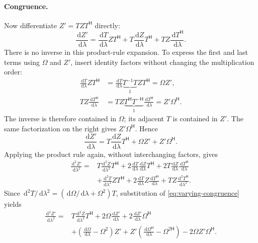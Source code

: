 \documentclass[11pt]{article}
\newcommand{\pv}[1]{{#1}}
\newcommand{\pvGreek}[1]{{#1}}
\newcommand{\pT}{\pv{T}}
\newcommand{\pZ}{\pv{Z}}
\newcommand{\pvOmega}{\pvGreek{\Omega}}
\numberwithin{equation}{section}
\newcommand{\dd}{\,\mathrm d}
\begin{document}
\paragraph{Congruence.}
Now differentiate $\pZ'=\pT\pZ\pT^{\mathsf H}$ directly:
\[
 \frac{\dd\pZ'}{\dd\lambda}
 =\frac{\dd\pT}{\dd\lambda}\pZ\pT^{\mathsf H}
   +\pT\frac{\dd\pZ}{\dd\lambda}\pT^{\mathsf H}
   +\pT\pZ\frac{\dd\pT^{\mathsf H}}{\dd\lambda}.
\]
There is no inverse in this product-rule expansion. To express the
first and last terms using $\pvOmega$ and $\pZ'$, insert identity
factors without changing the multiplication order:
\begin{align*}
 \frac{\dd\pT}{\dd\lambda}\pZ\pT^{\mathsf H}
 &=\frac{\dd\pT}{\dd\lambda}\underbrace{\pT^{-1}\pT}_{1}
   \pZ\pT^{\mathsf H}
 =\pvOmega\pZ',\\
 \pT\pZ\frac{\dd\pT^{\mathsf H}}{\dd\lambda}
 &=\pT\pZ\underbrace{\pT^{\mathsf H}\pT^{-\mathsf H}}_{1}
   \frac{\dd\pT^{\mathsf H}}{\dd\lambda}
 =\pZ'\pvOmega^{\mathsf H}.
\end{align*}
The inverse is therefore contained in $\pvOmega$; its adjacent $\pT$
is contained in $\pZ'$. The same factorization on the right gives
$\pZ'\pvOmega^{\mathsf H}$. Hence
\begin{equation}
 \frac{\dd\pZ'}{\dd\lambda}
 =\pT\frac{\dd\pZ}{\dd\lambda}\pT^{\mathsf H}
  +\pvOmega\pZ'+\pZ'\pvOmega^{\mathsf H}.
 \label{eq:varying-congruence}
\end{equation}
Applying the product rule again, without interchanging factors, gives
\begin{align*}
 \frac{\dd^2\pZ'}{\dd\lambda^2}={}&
 \pT\frac{\dd^2\pZ}{\dd\lambda^2}\pT^{\mathsf H}
 +2\frac{\dd\pT}{\dd\lambda}\frac{\dd\pZ}{\dd\lambda}\pT^{\mathsf H}
 +2\pT\frac{\dd\pZ}{\dd\lambda}\frac{\dd\pT^{\mathsf H}}{\dd\lambda}\\
 &+\frac{\dd^2\pT}{\dd\lambda^2}\pZ\pT^{\mathsf H}
 +2\frac{\dd\pT}{\dd\lambda}\pZ\frac{\dd\pT^{\mathsf H}}{\dd\lambda}
 +\pT\pZ\frac{\dd^2\pT^{\mathsf H}}{\dd\lambda^2}.
\end{align*}
Since $\dd^2\pT/\dd\lambda^2=(\dd\pvOmega/\dd\lambda+\pvOmega^2)\pT$,
substitution of \eqref{eq:varying-congruence} yields
\begin{equation}
 \boxed{\begin{aligned}
 \frac{\dd^2\pZ'}{\dd\lambda^2}={}&
 \pT\frac{\dd^2\pZ}{\dd\lambda^2}\pT^{\mathsf H}
 +2\pvOmega\frac{\dd\pZ'}{\dd\lambda}
 +2\frac{\dd\pZ'}{\dd\lambda}\pvOmega^{\mathsf H}\\
 &+\left(\frac{\dd\pvOmega}{\dd\lambda}-\pvOmega^2\right)\pZ'
 +\pZ'\left(\frac{\dd\pvOmega^{\mathsf H}}{\dd\lambda}
                  -\pvOmega^{2\mathsf H}\right)
 -2\pvOmega\pZ'\pvOmega^{\mathsf H}.
 \end{aligned}}
 \label{eq:frame-position-second-derivative}
\end{equation}
\end{document}
